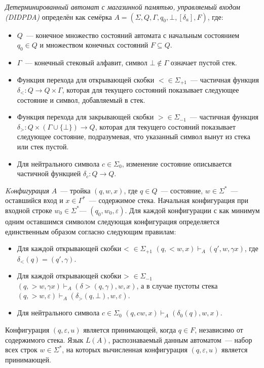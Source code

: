 \textit{Детерминированный автомат с магазинной памятью, управляемый входом (DIDPDA)} определён как семёрка $A = (\Sigma, Q, \Gamma, q_0, \bot, [\delta_a], F)$, где:
\begin{itemize}
	\item $Q$~--- конечное множество состояний автомата с начальным состоянием $q_0 \in Q$ и множеством конечных состояний $F \subseteq Q$.
	\item $\Gamma$~--- конечный стековый алфавит, символ $\bot \not\in \Gamma$ означает пустой стек.
         \item Функция перехода для открывающей скобки $< \in \Sigma_{+1}$~--- частичная функция $\delta_<: Q \rightarrow Q \times \Gamma$, которая для текущего состояний показывает следующее состояние и символ, добавляемый в стек.
         \item Функция перехода для закрывающей скобки $> \in \Sigma_{-1}$~--- частичная функция $\delta_>: Q \times (\Gamma \cup \{ \bot \}) \rightarrow Q$, которая для текущего состояний показывает следующее состояние, подразумевая, что указанный символ вынут из стека или стек пустой.
	\item Для нейтрального символа $c \in \Sigma_0$, изменение состояние описывается частичной функцией $\delta_c: Q \rightarrow Q$.
\end{itemize}
\textit{Koнфигурация} $A$~--- тройка $(q, w, x)$, где $q \in Q$~--- состояние, $w \in \Sigma^*$~--- оставшийся вход и $x \in \Gamma^*$~--- содержимое стека. Начальная конфигурация при входной строке $w_0 \in \Sigma^*$--- $(q_0, w_0, \varepsilon)$. Для каждой конфигурации с как минимум одним оставшимся символом следующая конфигурация определяется единственным образом согласно следующим правилам:
\begin{itemize}
         \item Для каждой открывающей скобки < $\in \Sigma_{+1}$ $(q, <w, x) \vdash_A (q', w, \gamma x)$, где $\delta_<(q) = (q', \gamma)$.
         \item Для каждой открывающей скобки > $\in \Sigma_{-1}$ $(q, >w,\gamma x) \vdash_A (\delta >(q, \gamma), w, x)$, а в случае пустоты стека $(q, >w, \varepsilon) \vdash_A (\delta_>(q, \bot), w, \varepsilon)$.
	\item Для нейтрального символа $c \in \Sigma_0$ $(q, cw, x) \vdash_A (\delta_0(q), w, x)$.
\end{itemize}
Конфигурация $(q, \varepsilon, u)$ является принимающей, когда $q \in F$, независимо от содержимого стека. Язык $L(A)$, распознаваемый данным автоматом~--- набор всех строк $w \in \Sigma^*$, на которых вычисленная конфигурация $(q, \varepsilon, u)$ является принимающей. 

